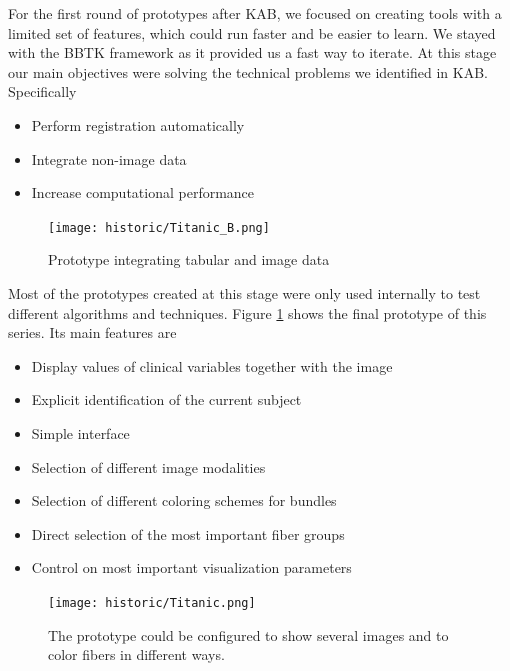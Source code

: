 
For the first round of prototypes after KAB, we focused on creating tools with a limited set of features, which could run faster and be easier to learn. We stayed with the BBTK framework as it provided us a fast way to iterate. At this stage our main objectives were solving the technical problems we identified in KAB. Specifically
\begin{itemize}
\item Perform registration automatically
\item Integrate non-image data
\item Increase computational performance
\end{itemize}

\begin{figure}
\centering
\texttt{[image: historic/Titanic\_B.png]} 
\caption{\label{fig_titanic}Prototype integrating tabular and image data}
\end{figure}

Most of the prototypes created at this stage were only used internally to test different algorithms and techniques. Figure \ref{fig_titanic} shows the final prototype of this series. Its main features are
\begin{itemize}
\item Display values of clinical variables together with the image
\item Explicit identification of the current subject
\item Simple interface
\item Selection of different image modalities
\item Selection of different coloring schemes for bundles
\item Direct selection of the most important fiber groups
\item Control on most important visualization parameters
\end{itemize}

\begin{figure}
\centering
\texttt{[image: historic/Titanic.png]} 
\caption{\label{fig_titanic_2}The prototype could be configured to show several images and to color fibers in different ways.}
\end{figure}

